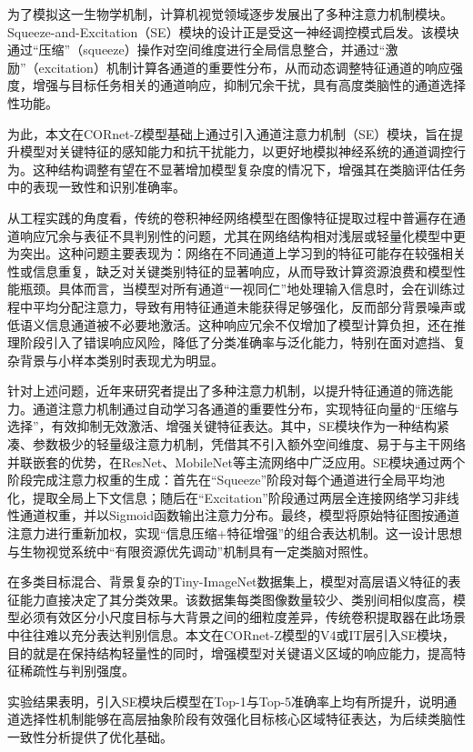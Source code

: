 为了模拟这一生物学机制，计算机视觉领域逐步发展出了多种注意力机制模块。Squeeze-and-Excitation（SE）模块的设计正是受这一神经调控模式启发。该模块通过“压缩”（squeeze）操作对空间维度进行全局信息整合，并通过“激励”（excitation）机制计算各通道的重要性分布，从而动态调整特征通道的响应强度，增强与目标任务相关的通道响应，抑制冗余干扰，具有高度类脑性的通道选择性功能\cite{hu2018squeeze}。

为此，本文在CORnet-Z模型基础上通过引入通道注意力机制（SE）模块，旨在提升模型对关键特征的感知能力和抗干扰能力，以更好地模拟神经系统的通道调控行为。这种结构调整有望在不显著增加模型复杂度的情况下，增强其在类脑评估任务中的表现一致性和识别准确率。

从工程实践的角度看，传统的卷积神经网络模型在图像特征提取过程中普遍存在通道响应冗余与表征不具判别性的问题，尤其在网络结构相对浅层或轻量化模型中更为突出。这种问题主要表现为：网络在不同通道上学习到的特征可能存在较强相关性或信息重复，缺乏对关键类别特征的显著响应，从而导致计算资源浪费和模型性能瓶颈\cite{he2016deep}。具体而言，当模型对所有通道“一视同仁”地处理输入信息时，会在训练过程中平均分配注意力，导致有用特征通道未能获得足够强化，反而部分背景噪声或低语义信息通道被不必要地激活。这种响应冗余不仅增加了模型计算负担，还在推理阶段引入了错误响应风险，降低了分类准确率与泛化能力，特别在面对遮挡、复杂背景与小样本类别时表现尤为明显\cite{wang2020eca}。

针对上述问题，近年来研究者提出了多种注意力机制，以提升特征通道的筛选能力。通道注意力机制通过自动学习各通道的重要性分布，实现特征向量的“压缩与选择”，有效抑制无效激活、增强关键特征表达。其中，SE模块作为一种结构紧凑、参数极少的轻量级注意力机制，凭借其不引入额外空间维度、易于与主干网络并联嵌套的优势，在ResNet、MobileNet等主流网络中广泛应用\cite{hu2018squeeze}。SE模块通过两个阶段完成注意力权重的生成：首先在“Squeeze”阶段对每个通道进行全局平均池化，提取全局上下文信息；随后在“Excitation”阶段通过两层全连接网络学习非线性通道权重，并以Sigmoid函数输出注意力分布。最终，模型将原始特征图按通道注意力进行重新加权，实现“信息压缩+特征增强”的组合表达机制。这一设计思想与生物视觉系统中“有限资源优先调动”机制具有一定类脑对照性。

在多类目标混合、背景复杂的Tiny-ImageNet数据集上，模型对高层语义特征的表征能力直接决定了其分类效果。该数据集每类图像数量较少、类别间相似度高，模型必须有效区分小尺度目标与大背景之间的细粒度差异，传统卷积提取器在此场景中往往难以充分表达判别信息。本文在CORnet-Z模型的V4或IT层引入SE模块，目的就是在保持结构轻量性的同时，增强模型对关键语义区域的响应能力，提高特征稀疏性与判别强度。

实验结果表明，引入SE模块后模型在Top-1与Top-5准确率上均有所提升，说明通道选择性机制能够在高层抽象阶段有效强化目标核心区域特征表达，为后续类脑性一致性分析提供了优化基础。

